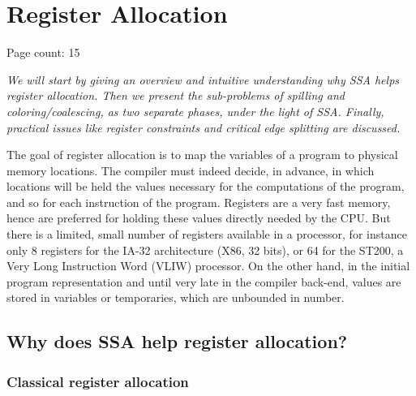 \chapter{Register Allocation}

{

Page count: 15


\def\ac#1{#1}
\def\dom{\preceq}
\def\ssa{SSA\xspace}



{\it
We will start by giving an overview and intuitive understanding why SSA helps 
register allocation. Then we present the sub-problems of spilling and 
coloring/coalescing, as two separate phases, under the light of SSA. Finally, 
practical issues like register constraints and critical edge splitting are 
discussed.


}


The goal of register allocation is to map the variables of a program to 
physical memory locations. The compiler must indeed decide, in advance, in 
which locations will be held the values necessary for the computations of the 
program, and so for each instruction of the program. Registers are a very fast 
memory, hence are preferred for holding these values directly needed by the 
CPU. But there is a limited, small number of registers available in a 
processor, for instance only 8 registers for the IA-32 architecture (X86, 32 
bits), or 64 for the ST200, a Very Long Instruction Word (VLIW) processor.  On 
the other hand, in the initial program representation and until very late in 
the compiler back-end, values are stored in variables or temporaries, which are 
unbounded in number.



\section{Why does SSA help register allocation?}


\subsection{Classical register allocation}

}

